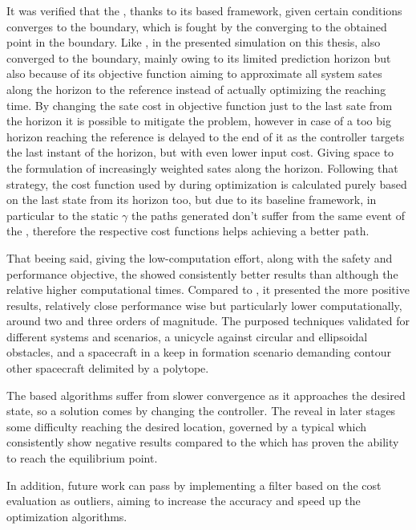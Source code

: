 It was verified that the , thanks to its based framework, given certain conditions converges to the boundary, which is fought by the  converging to the obtained point in the boundary. Like , in the presented simulation on this thesis,  also converged to the boundary, mainly owing to its limited prediction horizon but also because of its objective function aiming to approximate all system sates along the horizon to the reference instead of actually optimizing the reaching time. By changing the sate cost in objective function just to the last sate from the horizon it is possible to mitigate the problem, however in case of a too big horizon reaching the reference is delayed to the end of it as the controller targets the last instant of the horizon, but with even lower input cost. Giving space to the formulation of increasingly weighted sates along the horizon. Following that strategy, the cost function used by  during optimization is calculated purely based on the last state from its horizon too, but due to its baseline framework, in particular to the static \(\gamma\) the paths generated don't suffer from the same event of the , therefore the respective cost functions helps achieving a better path.       

That beeing said, giving the low-computation effort, along with the safety and performance objective, the  showed consistently better results than  although the relative higher computational times. Compared to , it presented the more positive results, relatively close performance wise but particularly lower computationally, around two and three orders of magnitude. The purposed techniques validated for different systems and scenarios, a unicycle against circular and ellipsoidal obstacles, and a spacecraft in a keep in formation scenario demanding contour other spacecraft delimited by a polytope.  

The  based algorithms suffer from slower convergence as it approaches the desired state, so a solution comes by changing the controller. The  reveal in later stages some difficulty reaching the desired location, governed by a typical  which consistently show negative results compared to the  which has proven the ability to reach the equilibrium point.

In addition, future work can pass by implementing a filter based on the cost evaluation as outliers, aiming to increase the accuracy and speed up the optimization algorithms.

